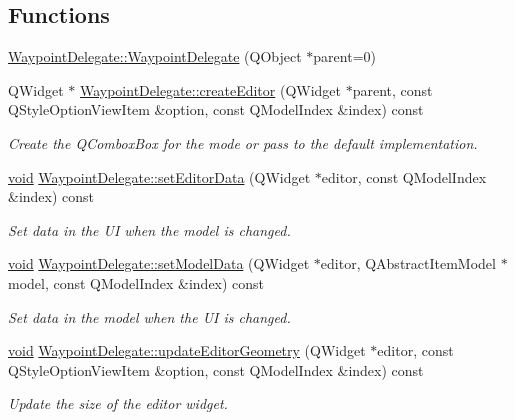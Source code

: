 \subsection*{\-Functions}
\begin{DoxyCompactItemize}
\item 
\hyperlink{group___path_planner_ga91775a49b804a156874199ff12e57110}{\-Waypoint\-Delegate\-::\-Waypoint\-Delegate} (\-Q\-Object $\ast$parent=0)
\item 
\-Q\-Widget $\ast$ \hyperlink{group___path_planner_ga8244740cc7a6bf781698edeebe341d8f}{\-Waypoint\-Delegate\-::create\-Editor} (\-Q\-Widget $\ast$parent, const \-Q\-Style\-Option\-View\-Item \&option, const \-Q\-Model\-Index \&index) const 
\begin{DoxyCompactList}\small\item\em \-Create the \-Q\-Combox\-Box for the mode or pass to the default implementation. \end{DoxyCompactList}\item 
\hyperlink{group___u_a_v_objects_plugin_ga444cf2ff3f0ecbe028adce838d373f5c}{void} \hyperlink{group___path_planner_gaea8e4c0fe854e7d0ed69544eef67180a}{\-Waypoint\-Delegate\-::set\-Editor\-Data} (\-Q\-Widget $\ast$editor, const \-Q\-Model\-Index \&index) const 
\begin{DoxyCompactList}\small\item\em \-Set data in the \-U\-I when the model is changed. \end{DoxyCompactList}\item 
\hyperlink{group___u_a_v_objects_plugin_ga444cf2ff3f0ecbe028adce838d373f5c}{void} \hyperlink{group___path_planner_gaf22bb7834577da6e336e7a52a563a89a}{\-Waypoint\-Delegate\-::set\-Model\-Data} (\-Q\-Widget $\ast$editor, \-Q\-Abstract\-Item\-Model $\ast$model, const \-Q\-Model\-Index \&index) const 
\begin{DoxyCompactList}\small\item\em \-Set data in the model when the \-U\-I is changed. \end{DoxyCompactList}\item 
\hyperlink{group___u_a_v_objects_plugin_ga444cf2ff3f0ecbe028adce838d373f5c}{void} \hyperlink{group___path_planner_ga19057f741d6491a3911c76e747a3479f}{\-Waypoint\-Delegate\-::update\-Editor\-Geometry} (\-Q\-Widget $\ast$editor, const \-Q\-Style\-Option\-View\-Item \&option, const \-Q\-Model\-Index \&index) const 
\begin{DoxyCompactList}\small\item\em \-Update the size of the editor widget. \end{DoxyCompactList}\item 

\end{DoxyCompactItemize}
